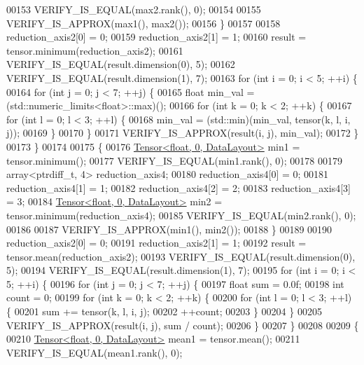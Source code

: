 \begin{DoxyCode}
00153     VERIFY\_IS\_EQUAL(max2.rank(), 0);
00154 
00155     VERIFY\_IS\_APPROX(max1(), max2());
00156   \}
00157 
00158   reduction\_axis2[0] = 0;
00159   reduction\_axis2[1] = 1;
00160   result = tensor.minimum(reduction\_axis2);
00161   VERIFY\_IS\_EQUAL(result.dimension(0), 5);
00162   VERIFY\_IS\_EQUAL(result.dimension(1), 7);
00163   \textcolor{keywordflow}{for} (\textcolor{keywordtype}{int} i = 0; i < 5; ++i) \{
00164     \textcolor{keywordflow}{for} (\textcolor{keywordtype}{int} j = 0; j < 7; ++j) \{
00165       \textcolor{keywordtype}{float} min\_val = (std::numeric\_limits<float>::max)();
00166       \textcolor{keywordflow}{for} (\textcolor{keywordtype}{int} k = 0; k < 2; ++k) \{
00167         \textcolor{keywordflow}{for} (\textcolor{keywordtype}{int} l = 0; l < 3; ++l) \{
00168           min\_val = (std::min)(min\_val, tensor(k, l, i, j));
00169         \}
00170       \}
00171       VERIFY\_IS\_APPROX(result(i, j), min\_val);
00172     \}
00173   \}
00174 
00175   \{
00176     \hyperlink{class_eigen_1_1_tensor}{Tensor<float, 0, DataLayout>} min1 = tensor.minimum();
00177     VERIFY\_IS\_EQUAL(min1.rank(), 0);
00178 
00179     array<ptrdiff\_t, 4> reduction\_axis4;
00180     reduction\_axis4[0] = 0;
00181     reduction\_axis4[1] = 1;
00182     reduction\_axis4[2] = 2;
00183     reduction\_axis4[3] = 3;
00184     \hyperlink{class_eigen_1_1_tensor}{Tensor<float, 0, DataLayout>} min2 = tensor.minimum(reduction\_axis4);
00185     VERIFY\_IS\_EQUAL(min2.rank(), 0);
00186 
00187     VERIFY\_IS\_APPROX(min1(), min2());
00188   \}
00189 
00190   reduction\_axis2[0] = 0;
00191   reduction\_axis2[1] = 1;
00192   result = tensor.mean(reduction\_axis2);
00193   VERIFY\_IS\_EQUAL(result.dimension(0), 5);
00194   VERIFY\_IS\_EQUAL(result.dimension(1), 7);
00195   \textcolor{keywordflow}{for} (\textcolor{keywordtype}{int} i = 0; i < 5; ++i) \{
00196     \textcolor{keywordflow}{for} (\textcolor{keywordtype}{int} j = 0; j < 7; ++j) \{
00197       \textcolor{keywordtype}{float} sum = 0.0f;
00198       \textcolor{keywordtype}{int} count = 0;
00199       \textcolor{keywordflow}{for} (\textcolor{keywordtype}{int} k = 0; k < 2; ++k) \{
00200         \textcolor{keywordflow}{for} (\textcolor{keywordtype}{int} l = 0; l < 3; ++l) \{
00201           sum += tensor(k, l, i, j);
00202           ++count;
00203         \}
00204       \}
00205       VERIFY\_IS\_APPROX(result(i, j), sum / count);
00206     \}
00207   \}
00208 
00209   \{
00210     \hyperlink{class_eigen_1_1_tensor}{Tensor<float, 0, DataLayout>} mean1 = tensor.mean();
00211     VERIFY\_IS\_EQUAL(mean1.rank(), 0);

\end{DoxyCode}
